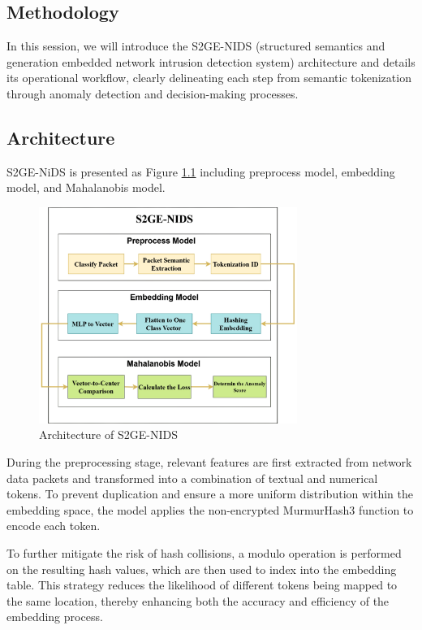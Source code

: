 \begin{ZhChapter}

    \chapter{Methodology}
    In this session, we will introduce the S2GE-NIDS (structured semantics and generation embedded network intrusion detection system) architecture and details its operational workflow, clearly delineating each step from semantic tokenization through anomaly detection and decision-making processes.
    \section{Architecture} %
    S2GE-NiDS is presented as Figure \ref{fig: Architecture} including preprocess model, embedding model, and Mahalanobis model.

    \begin{figure}[htbp]
        \centering
        \includegraphics[width = 0.75\textwidth]{image/Flow.jpg}
        \caption{Architecture of S2GE-NIDS}
        \label{fig: Architecture}
    \end{figure}

    During the preprocessing stage, relevant features are first extracted from network data packets and transformed into a combination of textual and numerical tokens. To prevent duplication and ensure a more uniform distribution within the embedding space, the model applies the non-encrypted MurmurHash3 function to encode each token.

    To further mitigate the risk of hash collisions, a modulo operation is performed on the resulting hash values, which are then used to index into the embedding table. This strategy reduces the likelihood of different tokens being mapped to the same location, thereby enhancing both the accuracy and efficiency of the embedding process.


\end{ZhChapter}
